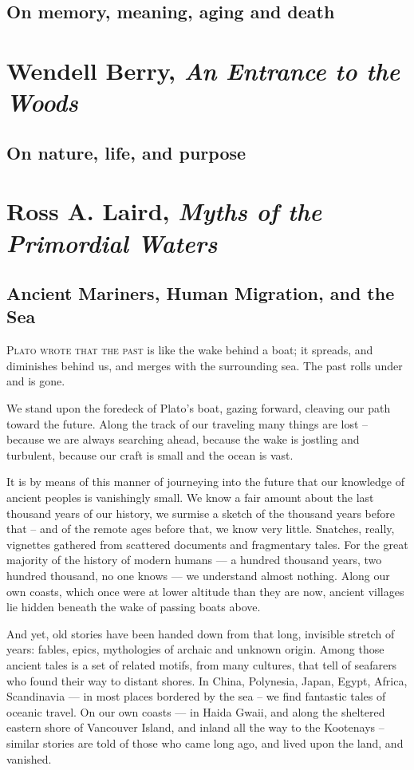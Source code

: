 \documentclass[letterpaper,oneside]{memoir}
\begin{document}
\begin{description}
\subsection{On memory, meaning, aging and death}
\newpage
\addtocounter{page}{+4}
\vspace*{5cm}
\section{Wendell Berry, \textit{An Entrance to the Woods}}
\subsection{On nature, life, and purpose}
\addtocounter{page}{+6}
\newpage
\section{Ross A. Laird, \textit{Myths of the Primordial Waters}}
\subsection{Ancient Mariners, Human Migration, and the Sea}

\lettrine[lhang=0.4, nindent=-2pt]{\textcolor[gray]{0.1}{P}}{lato
wrote that the past } is like the wake behind a boat; it spreads,
and diminishes behind us, and merges with the surrounding sea. The
past rolls under and is gone.

We stand upon the foredeck of Plato's boat, gazing forward, cleaving
our path toward the future. Along the track of our traveling many
things are lost -- because we are always searching ahead, because the
wake is jostling and turbulent, because our craft is small and the
ocean is vast.

It is by means of this manner of journeying into the future that our
knowledge of ancient peoples is vanishingly small. We know a fair
amount about the last thousand years of our history, we surmise a
sketch of the thousand years before that -- and of the remote ages
before that, we know very little. Snatches, really, vignettes gathered
from scattered documents and fragmentary tales. For the great majority
of the history of modern humans --- a hundred thousand years, two
hundred thousand, no one knows --- we understand almost nothing. Along
our own coasts, which once were at lower altitude than they are now,
ancient villages lie hidden beneath the wake of passing boats above.

And yet, old stories have been handed down from that long, invisible
stretch of years: fables, epics, mythologies of archaic and unknown
origin. Among those ancient tales is a set of related motifs, from
many cultures, that tell of seafarers who found their way to distant
shores. In China, Polynesia, Japan, Egypt, Africa, Scandinavia --- in
most places bordered by the sea -- we find fantastic tales of oceanic
travel. On our own coasts --- in Haida Gwaii, and along the sheltered
eastern shore of Vancouver Island, and inland all the way to the
Kootenays -- similar stories are told of those who came long ago, and
lived upon the land, and vanished.


\end{description}
\end{document}
